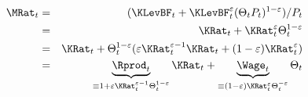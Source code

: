 \begin{eqnarray}
     \MRat_{t} & = & %
(\KLevBF_{t}+\KLevBF_{t}^{\varepsilon}(\Theta_{t}{P}_{t})^{1-\varepsilon})/{P}_{t} \label{eq:decomposeM} \nonumber
\\   & = & \KRat_{t}+\KRat_{t}^{\varepsilon}\Theta_{t}^{1-\varepsilon} \label{eq:trueM} \nonumber
\\   & = & \KRat_{t}+\Theta_{t}^{1-\varepsilon}(\varepsilon \KRat_{t}^{\varepsilon-1} \KRat_{t} + (1-\varepsilon) \KRat_{t}^{\varepsilon}) \nonumber
\\   & = & \underbrace{\Rprod_{t}}_{\equiv 1+\varepsilon \KRat_{t}^{\varepsilon-1}\Theta^{1-\varepsilon}_{t} } \KRat_{t} + \underbrace{\Wage_{t}}_{\equiv (1-\varepsilon)\KRat_{t}^{\varepsilon}\Theta_{t}^{-\varepsilon}} \Theta_{t}
\end{eqnarray}
